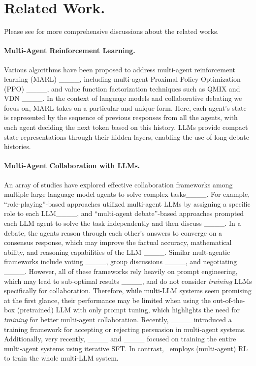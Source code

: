 \section{Related Work.}
Please see  for more comprehensive discussions about the related works.
\paragraph{Multi-Agent Reinforcement Learning. }
Various algorithms have been proposed to address multi-agent reinforcement learning (MARL) ____,  including multi-agent Proximal Policy Optimization (PPO) ____, and value function factorization techniques such as QMIX and VDN ____. In the context of language models and collaborative debating we focus on, MARL takes on a particular and unique form. Here, each agent's state is represented by the sequence of previous responses from all the agents, with each agent deciding the next token based on this history. LLMs provide compact state representations through their hidden layers, enabling the use of long debate histories. 

\paragraph{Multi-Agent Collaboration with LLMs. }
An array of studies have explored effective collaboration frameworks among multiple large language model agents to solve complex tasks____. For example, ``role-playing''-based approaches utilized multi-agent LLMs by assigning a specific role to each LLM____, and ``multi-agent debate''-based approaches prompted  each LLM agent to solve the task independently and then discuss ____. 
In a debate, the agents reason through each other's answers to converge on a consensus  response, which may improve the factual accuracy, mathematical ability, and reasoning capabilities of the LLM ____. Similar mult-agentic frameworks include voting ____, group discussions ____, and negotiating ____. However, all of these frameworks rely heavily on prompt engineering, which may lead to sub-optimal results ____, and do not consider {\it training} LLMs specifically for collaboration. Therefore, while 
multi-LLM systems seem promising at the first glance, their performance may be limited when using the  out-of-the-box  (pretrained)  LLM with only prompt tuning, which highlights the need for {\it training} for better multi-agent collaboration. Recently, ____ introduced a training framework for accepting or rejecting persuasion in multi-agent systems. Additionally, {very recently,} 
____ and ____ focused on training the entire multi-agent systems using iterative SFT.
In contrast,  \ourstwo~employs (multi-agent) RL to train the whole multi-LLM system.



